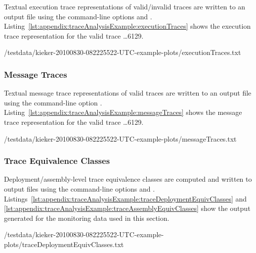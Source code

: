 Textual execution trace representations of valid/invalid traces are written to %
an output file using the command-line options \OPT{\OPTprintValidExecutionTraces} and %
\OPT{\OPTprintInvalidExecutionTraces}. %
Listing~\ref{lst:appendix:traceAnalysisExample:executionTraces} %
shows the execution trace representation for the valid trace \ldots6129.

\setTextListing
%
{\aspectJBookstoreApplicationDir/testdata/kieker-20100830-082225522-UTC-example-plots/executionTraces.txt} %

\subsubsection{Message Traces}\label{sec:example:messageTraces}%

Textual message trace representations of valid traces are written to an output %
file using the command-line option \OPT{\OPTprintMessageTraces}. %
Listing~\ref{lst:appendix:traceAnalysisExample:messageTraces} %
shows the message trace representation for the valid trace \ldots6129.

\setTextListing
%
{\aspectJBookstoreApplicationDir/testdata/kieker-20100830-082225522-UTC-example-plots/messageTraces.txt}

\subsubsection{Trace Equivalence Classes}\label{sec:example:traceEquivClasses}%

Deployment/assembly-level trace equivalence classes are computed and written %
to output files using the command-line options \OPT{\OPTprintDeploymentEquivalenceClasses} %
and \OPT{\OPTprintAssemblyEquivalenceClasses}. %
Listings~\ref{lst:appendix:traceAnalysisExample:traceDeploymentEquivClasses} and %
\ref{lst:appendix:traceAnalysisExample:traceAssemblyEquivClasses} show the %
output generated for the monitoring data used in this section. %

\setTextListing

{\aspectJBookstoreApplicationDir/testdata/kieker-20100830-082225522-UTC-example-plots/traceDeploymentEquivClasses.txt}

